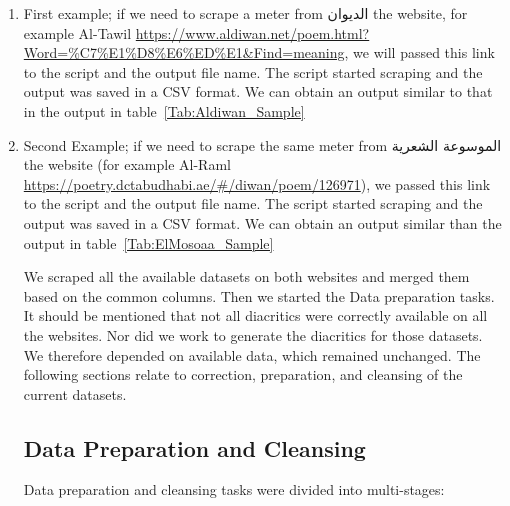 \begin{enumerate}
 \item First example; if we need to scrape a meter from \textarabic{الديوان} the website, for example Al-Tawil \url{https://www.aldiwan.net/poem.html?Word=\%C7\%E1\%D8\%E6\%ED\%E1\&Find=meaning}, we will passed this link to the script and the output file name. The script started scraping and the output was saved in a CSV format. We can obtain an output similar to that in the output in table~\ref{Tab:Aldiwan_Sample}

 \item Second Example; if we need to scrape the same meter from \textarabic{الموسوعة الشعرية} the website (for example Al-Raml \url{https://poetry.dctabudhabi.ae/\#/diwan/poem/126971}), we passed this link to the script and the output file name. The script started scraping and the output was saved in a CSV format. We can obtain an output similar than the output in table~\ref{Tab:ElMosoaa_Sample}

We scraped all the available datasets on both websites and merged them based on the common columns. Then we started the Data preparation tasks. It should be mentioned that not all diacritics were correctly available on all the websites. Nor did we work to generate the diacritics for those datasets. We therefore depended on available data, which remained unchanged. The following sections relate to correction, preparation, and cleansing of the current datasets.

 \subsection{Data Preparation and Cleansing}\label{sec:Data_Clens}

Data preparation and cleansing tasks were divided into multi-stages:


\end{enumerate}
